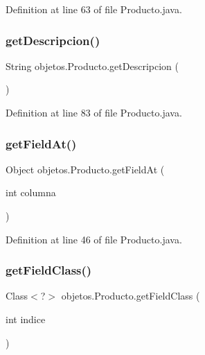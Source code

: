 Definition at line 63 of file Producto.\+java.

\mbox{\label{classobjetos_1_1_producto_a47b9a05a0e7a504aaa56564c1b146927}} 
\subsubsection{\texorpdfstring{get\+Descripcion()}{getDescripcion()}}
{\footnotesize\ttfamily String objetos.\+Producto.\+get\+Descripcion (\begin{DoxyParamCaption}{ }\end{DoxyParamCaption})}



Definition at line 83 of file Producto.\+java.

\mbox{\label{classobjetos_1_1_producto_a5857c7b25c0113cf682c7ea25a667fab}} 
\subsubsection{\texorpdfstring{get\+Field\+At()}{getFieldAt()}}
{\footnotesize\ttfamily Object objetos.\+Producto.\+get\+Field\+At (\begin{DoxyParamCaption}\item[{int}]{columna }\end{DoxyParamCaption})}



Definition at line 46 of file Producto.\+java.

\mbox{\label{classobjetos_1_1_producto_a6f54f8859ba9713ddb89fd082e811bd8}} 
\subsubsection{\texorpdfstring{get\+Field\+Class()}{getFieldClass()}}
{\footnotesize\ttfamily Class$<$?$>$ objetos.\+Producto.\+get\+Field\+Class (\begin{DoxyParamCaption}\item[{int}]{indice }\end{DoxyParamCaption})}




